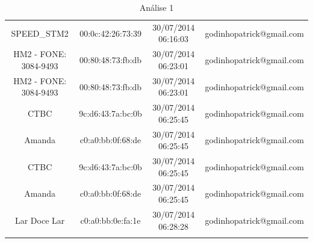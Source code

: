 \documentclass[12pt, %
openright, 
oneside,
a4paper,
brazil]{facom-ufu-abntex2}
\begin{document}
\begin{center}
\begin{longtable}{|c|c|c|c|}
SPEED\_STM2               & 00:0c:42:26:73:39 & 30/07/2014 06:16:03 & godinhopatrick@gmail.com \\
HM2 - FONE: 3084-9493     & 00:80:48:73:fb:db & 30/07/2014 06:23:01 & godinhopatrick@gmail.com \\
HM2 - FONE: 3084-9493     & 00:80:48:73:fb:db & 30/07/2014 06:23:01 & godinhopatrick@gmail.com \\
CTBC                      & 9c:d6:43:7a:bc:0b & 30/07/2014 06:25:45 & godinhopatrick@gmail.com \\
Amanda                    & c0:a0:bb:0f:68:de & 30/07/2014 06:25:45 & godinhopatrick@gmail.com \\
CTBC                      & 9c:d6:43:7a:bc:0b & 30/07/2014 06:25:45 & godinhopatrick@gmail.com \\
Amanda                    & c0:a0:bb:0f:68:de & 30/07/2014 06:25:45 & godinhopatrick@gmail.com \\
Lar Doce Lar              & c0:a0:bb:0e:fa:1e & 30/07/2014 06:28:28 & godinhopatrick@gmail.com \\

\caption{Análise 1}
\centering
\label{Análise 1}
\end{longtable}
\end{center}
\end{document}
